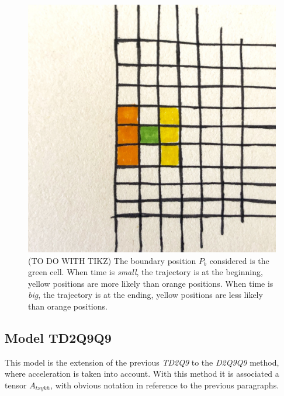 \documentclass[class=article, crop=false]{standalone}
\begin{document}
\begin{figure}[h]
\centering
\includegraphics[scale=0.1]{draw/Boundary_position_in_out}
\captionsetup{width=.6\linewidth}
\caption{(TO DO WITH TIKZ) The boundary position $P_b$ considered is the green cell.
When time is \emph{small}, the trajectory is at the beginning, yellow positions are more likely than orange positions.
When time is \emph{big}, the trajectory is at the ending, yellow positions are less likely than orange positions.}
\label{fig:boundary_position}
\end{figure}

\FloatBarrier
\subsection{Model TD2Q9Q9}
This model is the extension of the previous \emph{TD2Q9} to the \emph{D2Q9Q9} method, where acceleration is taken into account.
With this method it is associated a tensor $A_{t x y k h}$, with obvious notation in reference to the previous paragraphs.
\end{document}
